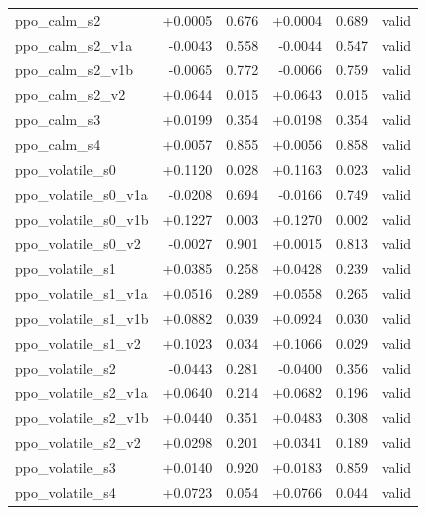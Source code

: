 \begin{table}[htbp]
\begin{tabular}{lrlrll}
ppo\_calm\_s2 & +0.0005 & 0.676 & +0.0004 & 0.689 & valid \\
ppo\_calm\_s2\_v1a & -0.0043 & 0.558 & -0.0044 & 0.547 & valid \\
ppo\_calm\_s2\_v1b & -0.0065 & 0.772 & -0.0066 & 0.759 & valid \\
ppo\_calm\_s2\_v2 & +0.0644 & 0.015 & +0.0643 & 0.015 & valid \\
ppo\_calm\_s3 & +0.0199 & 0.354 & +0.0198 & 0.354 & valid \\
ppo\_calm\_s4 & +0.0057 & 0.855 & +0.0056 & 0.858 & valid \\
ppo\_volatile\_s0 & +0.1120 & 0.028 & +0.1163 & 0.023 & valid \\
ppo\_volatile\_s0\_v1a & -0.0208 & 0.694 & -0.0166 & 0.749 & valid \\
ppo\_volatile\_s0\_v1b & +0.1227 & 0.003 & +0.1270 & 0.002 & valid \\
ppo\_volatile\_s0\_v2 & -0.0027 & 0.901 & +0.0015 & 0.813 & valid \\
ppo\_volatile\_s1 & +0.0385 & 0.258 & +0.0428 & 0.239 & valid \\
ppo\_volatile\_s1\_v1a & +0.0516 & 0.289 & +0.0558 & 0.265 & valid \\
ppo\_volatile\_s1\_v1b & +0.0882 & 0.039 & +0.0924 & 0.030 & valid \\
ppo\_volatile\_s1\_v2 & +0.1023 & 0.034 & +0.1066 & 0.029 & valid \\
ppo\_volatile\_s2 & -0.0443 & 0.281 & -0.0400 & 0.356 & valid \\
ppo\_volatile\_s2\_v1a & +0.0640 & 0.214 & +0.0682 & 0.196 & valid \\
ppo\_volatile\_s2\_v1b & +0.0440 & 0.351 & +0.0483 & 0.308 & valid \\
ppo\_volatile\_s2\_v2 & +0.0298 & 0.201 & +0.0341 & 0.189 & valid \\
ppo\_volatile\_s3 & +0.0140 & 0.920 & +0.0183 & 0.859 & valid \\
ppo\_volatile\_s4 & +0.0723 & 0.054 & +0.0766 & 0.044 & valid \\
\bottomrule
\end{tabular}
\end{table}

